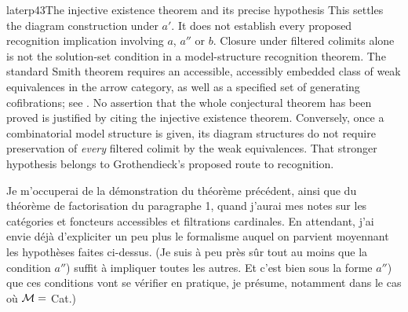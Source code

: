 \begin{dcomment}{later}{p43}{The injective existence theorem and its precise hypothesis}
This settles the diagram construction under $a'$. It does not establish every proposed recognition implication involving $a$, $a''$ or $b$. Closure under filtered colimits alone is not the solution-set condition in a model-structure recognition theorem. The standard Smith theorem requires an accessible, accessibly embedded class of weak equivalences in the arrow category, as well as a specified set of generating cofibrations; see \citet[Proposition~1.7]{Barwick2007}. No assertion that the whole conjectural theorem has been proved is justified by citing the injective existence theorem. Conversely, once a combinatorial model structure is given, its diagram structures do not require preservation of \emph{every} filtered colimit by the weak equivalences. That stronger hypothesis belongs to Grothendieck's proposed route to recognition.
\end{dcomment}


Je m'occuperai de la démonstration du théorème précédent, ainsi que du théorème de factorisation du paragraphe 1, quand j'aurai mes notes sur les catégories et foncteurs accessibles et filtrations cardinales. En attendant, j'ai envie déjà d'expliciter un peu plus le formalisme auquel on parvient moyennant les hypothèses faites ci-dessus. (Je suis à peu près sûr tout au moins que la condition $a''$) suffit à impliquer toutes les autres. Et c'est bien sous la forme $a''$) que ces conditions vont se vérifier en pratique, je présume, notamment dans le cas où $\mathcal{M} = $ Cat.)

